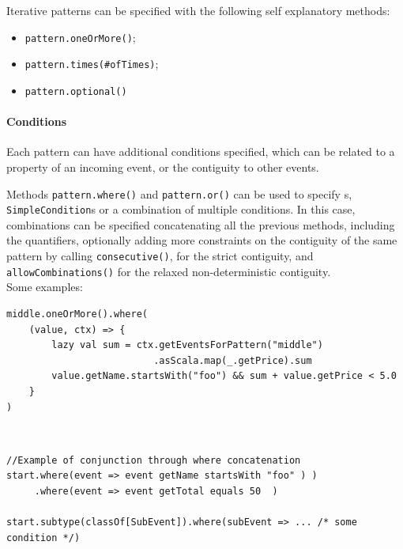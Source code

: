 Iterative patterns can be specified with the following self explanatory methods:

\begin{itemize}
    \item \texttt{pattern.oneOrMore()};
    \item \texttt{pattern.times(\#ofTimes)};
    \item \texttt{pattern.optional()}
\end{itemize}

\paragraph{Conditions}

Each pattern can have additional conditions specified, which can be related to a property of an incoming event, or the contiguity to other events.

Methods \texttt{pattern.where()} and \texttt{pattern.or()} can be used to specify \texttt{}s, \texttt{SimpleCondition}s or a combination of multiple conditions. In this case, combinations can be specified concatenating all the previous methods, including the quantifiers, optionally adding more constraints on the contiguity of the same pattern by calling \texttt{consecutive()}, for the strict contiguity, and \texttt{allowCombinations()} for the relaxed non-deterministic contiguity.
\\
Some examples:

\begin{code}
\label{code:iterative-cond}
\begin{verbatim}
middle.oneOrMore().where(
    (value, ctx) => {
        lazy val sum = ctx.getEventsForPattern("middle")
                          .asScala.map(_.getPrice).sum
        value.getName.startsWith("foo") && sum + value.getPrice < 5.0
    }
)
\end{verbatim}
\end{code}~\\

\begin{code}
    \label{code:simple-cond}
    \begin{verbatim}
//Example of conjunction through where concatenation
start.where(event => event getName startsWith "foo" ) )
     .where(event => event getTotal equals 50  )

start.subtype(classOf[SubEvent]).where(subEvent => ... /* some condition */)
    \end{verbatim}
\end{code}~\\


